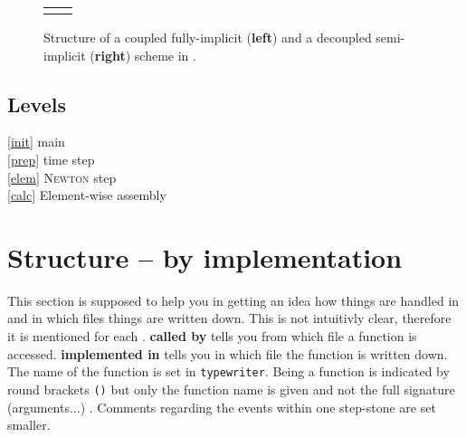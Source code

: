 \begin{figure}[hbt]
\begin{tabular}{ l | l }
\begin{minipage}[t]{0.48\textwidth}
\end{minipage}
\end{tabular}

\caption{Structure of a coupled fully-implicit (\textbf{left}) and a decoupled semi-implicit (\textbf{right}) scheme in \Dumux.}
\label{fig:algorithm}
\end{figure}

\subsection{Levels}

\textcircled{\ref{init}} main\\
\textcircled{\ref{prep}} time step\\
\textcircled{\ref{elem}} \textsc{Newton} step\\
\textcircled{\ref{calc}} Element-wise assembly

\section{Structure --  by implementation}
 \label{implementation}
This section is supposed to help you in getting an idea how things are handled in \Dumux and in which files things are written down. 
This is not intuitivly clear, therefore it is mentioned for each . \textbf{called by} tells you from which file a function is 
accessed. \textbf{implemented in} tells you in which file the function is written down. The name of the function is set in \verb+typewriter+. 
Being a function is indicated by round brackets \verb+()+ but only the function name is given and not the full signature (arguments...) .
 Comments regarding the events within one step-stone are set \scriptsize{smaller}.



